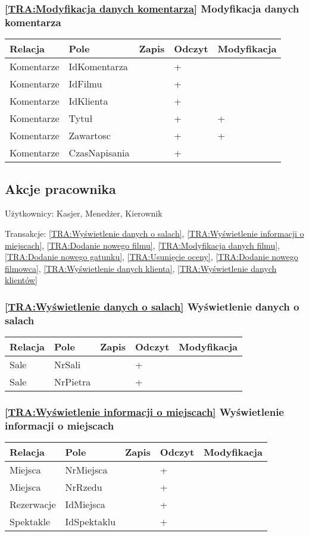 \subsubsection*{\ref{TRA:Modyfikacja danych komentarza} Modyfikacja danych komentarza}
\begin{tabularx}{\textwidth}{|Y|Y|Y|Y|Y|}\hline
Relacja & Pole & Zapis & Odczyt & Modyfikacja \\\hline
Komentarze & IdKomentarza &  & + & \\
Komentarze & IdFilmu &  & + & \\
Komentarze & IdKlienta &  & + & \\
Komentarze & Tytuł &  & + & +\\
Komentarze & Zawartosc &  & + & +\\
Komentarze & CzasNapisania &  & + & \\
\hline\end{tabularx}
\subsection{Akcje pracownika}
Użytkownicy: Kasjer, Menedżer, Kierownik

Transakcje: \ref{TRA:Wyświetlenie danych o salach}, \ref{TRA:Wyświetlenie informacji o miejscach}, \ref{TRA:Dodanie nowego filmu}, \ref{TRA:Modyfikacja danych filmu}, \ref{TRA:Dodanie nowego gatunku}, \ref{TRA:Usunięcie oceny}, \ref{TRA:Dodanie nowego filmowca}, \ref{TRA:Wyświetlenie danych klienta}, \ref{TRA:Wyświetlenie danych klientów}
\subsubsection*{\ref{TRA:Wyświetlenie danych o salach} Wyświetlenie danych o salach}
\begin{tabularx}{\textwidth}{|Y|Y|Y|Y|Y|}\hline
Relacja & Pole & Zapis & Odczyt & Modyfikacja \\\hline
Sale & NrSali &  & + & \\
Sale & NrPietra &  & + & \\
\hline\end{tabularx}
\subsubsection*{\ref{TRA:Wyświetlenie informacji o miejscach} Wyświetlenie informacji o miejscach}
\begin{tabularx}{\textwidth}{|Y|Y|Y|Y|Y|}\hline
Relacja & Pole & Zapis & Odczyt & Modyfikacja \\\hline
Miejsca & NrMiejsca &  & + & \\
Miejsca & NrRzedu &  & + & \\
Rezerwacje & IdMiejsca &  & + & \\
Spektakle & IdSpektaklu &  & + & \\
\hline\end{tabularx}
